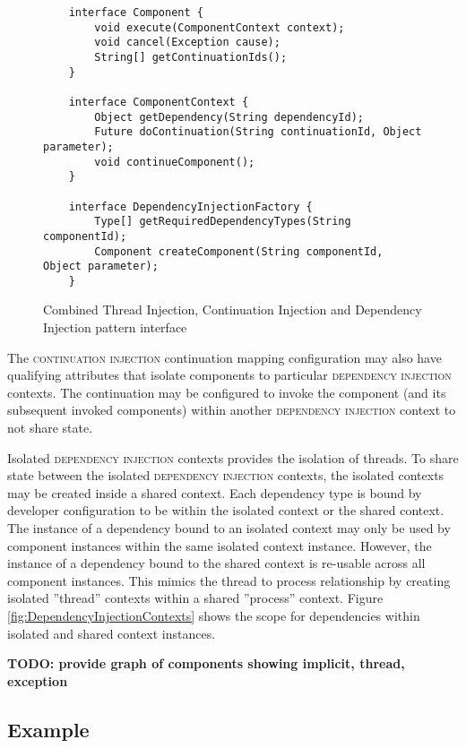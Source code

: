 \documentclass[prodmode]{style/acmlarge}
\begin{document}
\begin{figure}[tp]
\centering
\begin{verbatim}
    interface Component {
        void execute(ComponentContext context);
        void cancel(Exception cause);
        String[] getContinuationIds();
    }

    interface ComponentContext {
        Object getDependency(String dependencyId);
        Future doContinuation(String continuationId, Object parameter);
        void continueComponent();
    }
    
    interface DependencyInjectionFactory {
        Type[] getRequiredDependencyTypes(String componentId);
        Component createComponent(String componentId, Object parameter);
    }
\end{verbatim}
\caption{Combined Thread Injection, Continuation Injection and Dependency Injection pattern interface\footnotemark}
\label{fig:IocInjectionInterfaces}
\end{figure}


The \textsc{continuation injection} continuation mapping configuration may also
have qualifying attributes that isolate components to particular
\textsc{dependency injection} contexts.  The continuation may be configured to
invoke the component (and its subsequent invoked components) within another
\textsc{dependency injection} context to not share state.

Isolated \textsc{dependency injection} contexts provides the isolation of
threads.  To share state between the isolated \textsc{dependency injection}
contexts, the isolated contexts may be created inside a shared context.  Each
dependency type is bound by developer configuration to be within the isolated
context or the shared context.  The instance of a dependency bound to an
isolated context may only be used by component instances within the same
isolated context instance.  However, the instance of a dependency bound to the
shared context is re-usable across all component instances.  This mimics the
thread to process relationship by creating isolated ''thread'' contexts within a
shared ''process'' context.  Figure \ref{fig:DependencyInjectionContexts} shows
the scope for dependencies within isolated and shared context instances.

\textbf{TODO: provide graph of components showing implicit, thread, exception}


\subsection{Example}
\end{document}
